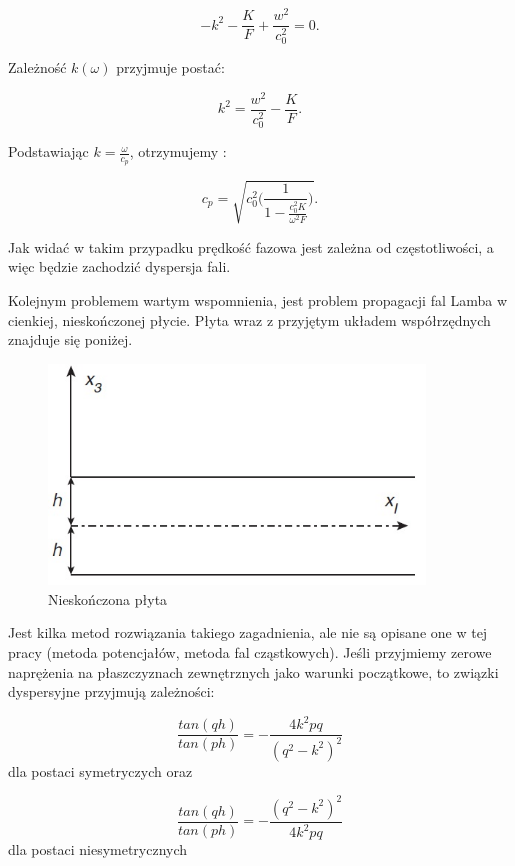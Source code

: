 \begin{equation}
-k^2-\frac{K}{F}+\frac{w^2}{c_0^2}=0.
\end{equation}

Zależność \(k(\omega)\) przyjmuje postać:

\begin{equation}
k^2=\frac{w^2}{c_0^2}-\frac{K}{F}.
\end{equation}

Podstawiając \( k=\frac{\omega}{c_p}\), otrzymujemy :

\begin{equation}
c_p = \sqrt{c_0^2\Bigg( \frac{1}{1 - \frac{c_0^2 K}{\omega^2 F} } \Bigg)}.
\end{equation}

Jak widać w takim przypadku prędkość fazowa jest zależna od częstotliwości, a więc będzie zachodzić dyspersja fali.

Kolejnym problemem wartym wspomnienia, jest problem propagacji fal Lamba w cienkiej, nieskończonej płycie. Płyta wraz z przyjętym układem współrzędnych znajduje się poniżej.

\begin{figure}[h]
\centering
\includegraphics[width=10cm]{Zdjecia/2/dyspersja_analitycznie_plyta}
\caption{Nieskończona płyta}
\label{fig:nieskonczona_plyta}
\end{figure}

Jest kilka metod rozwiązania takiego zagadnienia, ale nie są opisane one w tej pracy (metoda potencjałów, metoda fal cząstkowych). Jeśli przyjmiemy zerowe naprężenia na płaszczyznach zewnętrznych jako warunki początkowe, to związki dyspersyjne przyjmują zależności:

\begin{equation}
\frac{tan(qh)}{tan(ph)}=-\frac{4k^2pq}{(q^2-k^2)^2}
\end{equation}
dla postaci symetryczych oraz

\begin{equation}
\frac{tan(qh)}{tan(ph)}=-\frac{(q^2-k^2)^2}{4k^2pq}
\end{equation}
dla postaci niesymetrycznych

